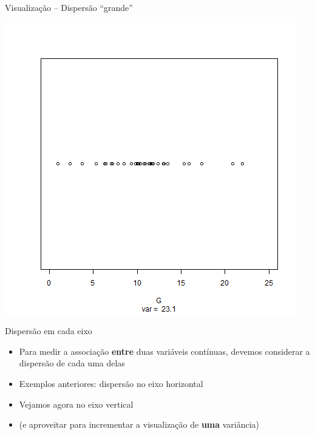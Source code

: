 \documentclass{beamer}
\begin{document}
\begin{frame}{\scriptsize Visualização -- Dispersão ``grande''}
  \begin{center}
    \includegraphics[height=.8\textheight]{Cap17/dot-G}
  \end{center}
\end{frame}

\begin{frame}{\scriptsize Dispersão em cada eixo}
  \begin{itemize}
    \footnotesize
  \item Para medir a associação {\bf entre} duas variáveis contínuas, devemos considerar a dispersão de cada uma delas
    \small
    \bigskip
    \bigskip
  \item Exemplos anteriores: dispersão no eixo horizontal
  \item Vejamos agora no eixo vertical
    \bigskip
    \bigskip
    \footnotesize
  \item (e aproveitar para incrementar a visualização de {\bf uma} variância)
  \end{itemize}
\end{frame}
\end{document}
